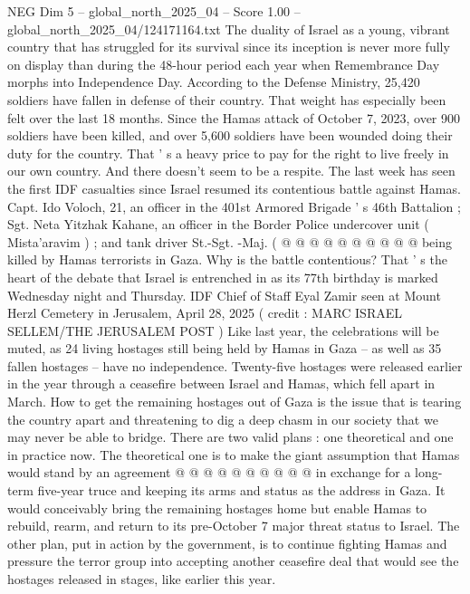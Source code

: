 \begin{textsample}{NEG Dim 5 – global\_north\_2025\_04 – Score 1.00 – global\_north\_2025\_04/124171164.txt}  \label{ex:f5_neg_343}
The duality of Israel as a young, vibrant country that has struggled for its survival since its inception is never more fully on display than during the 48-hour period each year when Remembrance Day morphs into Independence Day.
According to the Defense Ministry, 25,420 soldiers have fallen in defense of their country.
That weight has especially been felt over the last 18 months.
Since the Hamas attack of October 7, 2023, over 900 soldiers have been killed, and over 5,600 soldiers have been wounded doing their duty for the country.
That ' s a heavy price to pay for the right to live freely in our own country.
And there doesn't seem to be a respite.
The last week has seen the first IDF casualties since Israel resumed its contentious battle against Hamas.
Capt.
Ido Voloch, 21, an officer in the 401st Armored Brigade ' s 46th Battalion ; Sgt.
Neta Yitzhak Kahane, an officer in the Border Police undercover unit ( Mista'aravim ) ; and tank driver St.-Sgt. -Maj. ( @ @ @ @ @ @ @ @ @ @ being killed by Hamas terrorists in Gaza.
Why is the battle contentious?
That ' s the heart of the debate that Israel is entrenched in as its 77th birthday is marked Wednesday night and Thursday.
IDF Chief of Staff Eyal Zamir seen at Mount Herzl Cemetery in Jerusalem, April 28, 2025 ( credit : MARC ISRAEL SELLEM/THE JERUSALEM POST ) Like last year, the celebrations will be muted, as 24 living hostages still being held by Hamas in Gaza -- as well as 35 fallen hostages -- have no independence.
Twenty-five hostages were released earlier in the year through a ceasefire between Israel and Hamas, which fell apart in March.
How to get the remaining hostages out of Gaza is the issue that is tearing the country apart and threatening to dig a deep chasm in our society that we may never be able to bridge.
There are two valid plans : one theoretical and one in practice now.
The theoretical one is to make the giant assumption that Hamas would stand by an agreement @ @ @ @ @ @ @ @ @ @ in exchange for a long-term five-year truce and keeping its arms and status as the address in Gaza.
It would conceivably bring the remaining hostages home but enable Hamas to rebuild, rearm, and return to its pre-October 7 major threat status to Israel.
The other plan, put in action by the government, is to continue fighting Hamas and pressure the terror group into accepting another ceasefire deal that would see the hostages released in stages, like earlier this year.

\end{textsample}
